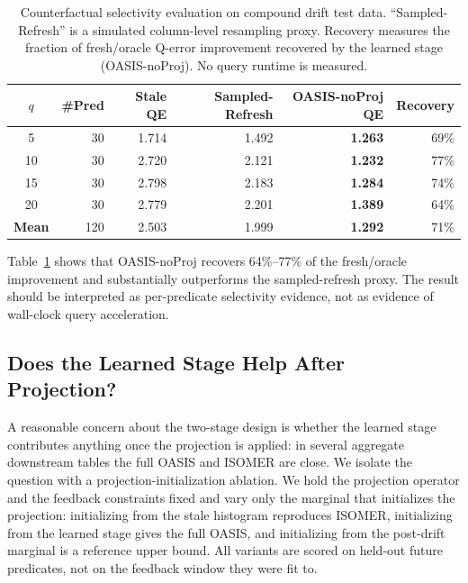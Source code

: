 \documentclass[preprint,12pt]{elsarticle}
\begin{document}
\begin{table}[t]
  \centering
  \small
  \caption{Counterfactual selectivity evaluation on compound drift test data.
  ``Sampled-Refresh'' is a simulated column-level resampling proxy. Recovery
  measures the fraction of fresh/oracle Q-error improvement recovered by the
  learned stage (OASIS-noProj). No query runtime is measured.}
  \label{tab:counterfactual_selectivity}
  \setlength{\tabcolsep}{3.5pt}
  \begin{tabular}{c r r r r r}
    \toprule
    $q$ & \#Pred & Stale QE & Sampled-Refresh & OASIS-noProj QE & Recovery \\
    \midrule
     5 & 30 & 1.714 & 1.492 & \textbf{1.263} & 69\% \\
    10 & 30 & 2.720 & 2.121 & \textbf{1.232} & 77\% \\
    15 & 30 & 2.798 & 2.183 & \textbf{1.284} & 74\% \\
    20 & 30 & 2.779 & 2.201 & \textbf{1.389} & 64\% \\
    \midrule
    \textbf{Mean} & 120 & 2.503 & 1.999 & \textbf{1.292} & 71\% \\
    \bottomrule
  \end{tabular}
\end{table}

Table~\ref{tab:counterfactual_selectivity} shows that OASIS-noProj recovers
64\%--77\% of the fresh/oracle improvement and substantially outperforms the
sampled-refresh proxy. The result should be interpreted as per-predicate
selectivity evidence, not as evidence of wall-clock query acceleration.

\subsection{Does the Learned Stage Help After Projection?}
\label{sec:projection-init}

A reasonable concern about the two-stage design is whether the learned stage
contributes anything once the projection is applied: in several aggregate
downstream tables the full OASIS and ISOMER are close. We isolate the question
with a projection-initialization ablation. We hold the projection operator and
the feedback constraints fixed and vary only the marginal that initializes the
projection: initializing from the stale histogram reproduces ISOMER,
initializing from the learned stage gives the full OASIS, and initializing from
the post-drift marginal is a reference upper bound. All variants are scored on
held-out future predicates, not on the feedback window they were fit to.
\end{document}
